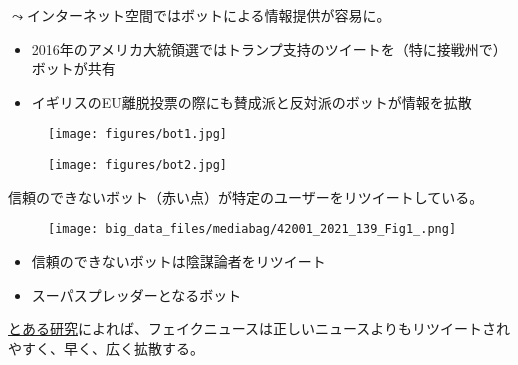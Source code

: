 \documentclass[
  xelatex,
  ja=standard]{bxjsarticle}
\providecommand{\tightlist}{%
  \setlength{\itemsep}{0pt}\setlength{\parskip}{0pt}}\usepackage{longtable,booktabs,array}
\begin{document}
\(\leadsto\)インターネット空間ではボットによる情報提供が容易に\citep{lazer2009, ferrara2016}。

\begin{itemize}
\tightlist
\item
  2016年のアメリカ大統領選ではトランプ支持のツイートを（特に接戦州で）ボットが共有
\item
  イギリスのEU離脱投票の際にも賛成派と反対派のボットが情報を拡散
\end{itemize}

\begin{figure}[htpb]

{\centering \texttt{[image: figures/bot1.jpg]}

}

\caption{\citet{gorodnichenko2021}}

\end{figure}

\begin{figure}[htpb]

{\centering \texttt{[image: figures/bot2.jpg]}

}

\caption{\citet{gorodnichenko2021}}

\end{figure}

信頼のできないボット（赤い点）が特定のユーザーをリツイートしている。

\begin{figure}[htpb]

{\centering \texttt{[image: big\_data\_files/mediabag/42001\_2021\_139\_Fig1\_.png]}

}

\caption{\citet{xu2022}}

\end{figure}

\begin{itemize}
\tightlist
\item
  信頼のできないボットは陰謀論者をリツイート
\item
  スーパスプレッダーとなるボット
\end{itemize}

\href{https://www.natureasia.com/ja-jp/ndigest/v15/n5/\%E3\%83\%95\%E3\%82\%A7\%E3\%82\%A4\%E3\%82\%AF\%E3\%83\%8B\%E3\%83\%A5\%E3\%83\%BC\%E3\%82\%B9\%E3\%81\%AF\%E9\%80\%9F\%E3\%81\%8F\%E5\%BA\%83\%E3\%81\%8F\%E4\%BC\%9D\%E3\%82\%8F\%E3\%82\%8B/92004}{とある研究}によれば、フェイクニュースは正しいニュースよりもリツイートされやすく、早く、広く拡散する。
\end{document}
